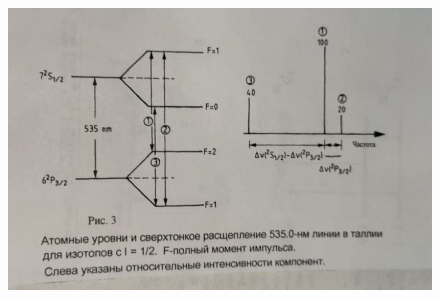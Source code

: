 \documentclass[a4paper, 12pt]{article}%
\begin{document}
	\begin{figure}[H]
		\centering
		\includegraphics[width=1\linewidth]{levels.jpeg}
	\end{figure}
	

	\newpage
	
\end{document}
